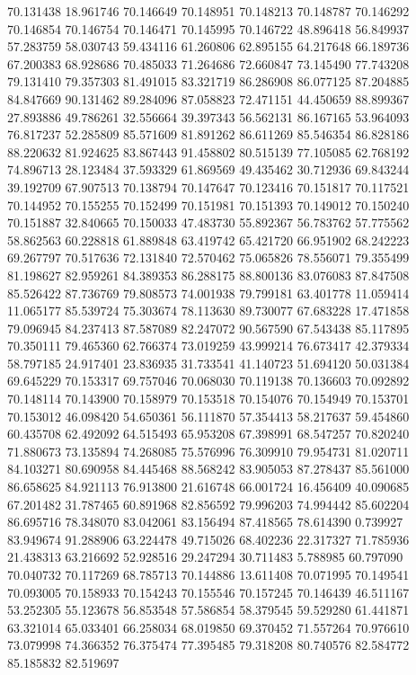 70.131438
18.961746
70.146649
70.148951
70.148213
70.148787
70.146292
70.146854
70.146754
70.146471
70.145995
70.146722
48.896418
56.849937
57.283759
58.030743
59.434116
61.260806
62.895155
64.217648
66.189736
67.200383
68.928686
70.485033
71.264686
72.660847
73.145490
77.743208
79.131410
79.357303
81.491015
83.321719
86.286908
86.077125
87.204885
84.847669
90.131462
89.284096
87.058823
72.471151
44.450659
88.899367
27.893886
49.786261
32.556664
39.397343
56.562131
86.167165
53.964093
76.817237
52.285809
85.571609
81.891262
86.611269
85.546354
86.828186
88.220632
81.924625
83.867443
91.458802
80.515139
77.105085
62.768192
74.896713
28.123484
37.593329
61.869569
49.435462
30.712936
69.843244
39.192709
67.907513
70.138794
70.147647
70.123416
70.151817
70.117521
70.144952
70.155255
70.152499
70.151981
70.151393
70.149012
70.150240
70.151887
32.840665
70.150033
47.483730
55.892367
56.783762
57.775562
58.862563
60.228818
61.889848
63.419742
65.421720
66.951902
68.242223
69.267797
70.517636
72.131840
72.570462
75.065826
78.556071
79.355499
81.198627
82.959261
84.389353
86.288175
88.800136
83.076083
87.847508
85.526422
87.736769
79.808573
74.001938
79.799181
63.401778
11.059414
11.065177
85.539724
75.303674
78.113630
89.730077
67.683228
17.471858
79.096945
84.237413
87.587089
82.247072
90.567590
67.543438
85.117895
70.350111
79.465360
62.766374
73.019259
43.999214
76.673417
42.379334
58.797185
24.917401
23.836935
31.733541
41.140723
51.694120
50.031384
69.645229
70.153317
69.757046
70.068030
70.119138
70.136603
70.092892
70.148114
70.143900
70.158979
70.153518
70.154076
70.154949
70.153701
70.153012
46.098420
54.650361
56.111870
57.354413
58.217637
59.454860
60.435708
62.492092
64.515493
65.953208
67.398991
68.547257
70.820240
71.880673
73.135894
74.268085
75.576996
76.309910
79.954731
81.020711
84.103271
80.690958
84.445468
88.568242
83.905053
87.278437
85.561000
86.658625
84.921113
76.913800
21.616748
66.001724
16.456409
40.090685
67.201482
31.787465
60.891968
82.856592
79.996203
74.994442
85.602204
86.695716
78.348070
83.042061
83.156494
87.418565
78.614390
0.739927
83.949674
91.288906
63.224478
49.715026
68.402236
22.317327
71.785936
21.438313
63.216692
52.928516
29.247294
30.711483
5.788985
60.797090
70.040732
70.117269
68.785713
70.144886
13.611408
70.071995
70.149541
70.093005
70.158933
70.154243
70.155546
70.157245
70.146439
46.511167
53.252305
55.123678
56.853548
57.586854
58.379545
59.529280
61.441871
63.321014
65.033401
66.258034
68.019850
69.370452
71.557264
70.976610
73.079998
74.366352
76.375474
77.395485
79.318208
80.740576
82.584772
85.185832
82.519697
